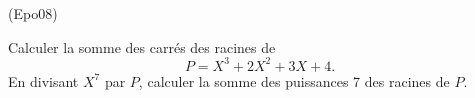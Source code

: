 \begin{tiny}(Epo08)\end{tiny} Calculer la somme des carr{\'e}s des racines de
\[
P = X^{3}+2X^{2}+3X+4 .
\]
En divisant $X^7$ par $P$, calculer la somme des puissances 7 des racines de $P$.
